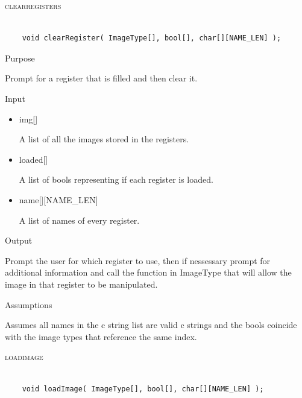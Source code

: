 \documentclass[pdftex, 11pt]{article}
\begin{document}
\begin{description}
	\item{\textsc{clearregisters}}

		\begin{lstlisting}

	void clearRegister( ImageType[], bool[], char[][NAME_LEN] );
		\end{lstlisting}

		\begin{description}
			\item{Purpose}

				Prompt for a register that is filled and then clear it.
				
			\item{Input}

				\begin{itemize}

					\item{img[]}

						A list of all the images stored in the registers.

					\item{loaded[]}

						A list of bools representing if each register is loaded.

					\item{name[][NAME\_LEN]}

						A list of names of every register.

				\end{itemize}

			\item{Output}

				Prompt the user for which register to use, then if nessessary
				prompt for additional information and call the function
				in ImageType that will allow the image in that register to
				be manipulated.

			\item{Assumptions}

				Assumes all names in the c string list are valid c
				strings and the bools coincide with the image types that
				reference the same index.

		\end{description}



	\item{\textsc{loadimage}}

		\begin{lstlisting}

	void loadImage( ImageType[], bool[], char[][NAME_LEN] );
		\end{lstlisting}


\end{description}
\end{document}
